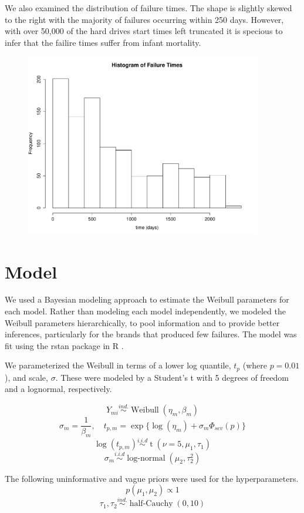 \documentclass{scrartcl}
\begin{document}
\noindent We also examined the distribution of failure times.  The shape is slightly skewed to the right with the majority of failures occurring within 250 days. However, with over 50,000 of the hard drives start times left truncated it is specious to infer that the failire times suffer from infant mortality.   
\begin{figure}[H]
\centering
\includegraphics[height=8cm]{failhist.pdf}
\end{figure}

\section*{Model}
We used a Bayesian modeling approach to estimate the Weibull parameters for each model. Rather than modeling each model independently, we modeled the Weibull parameters hierarchically, to pool information and to provide better inferences, particularly for the brands that produced few failures. The model was fit using the rstan package in R \cite{stan}.

We parameterized the Weibull in terms of a lower log quantile, $t_p$ (where $p=0.01$), and scale, $\sigma$. These were modeled by a Student's t with 5 degrees of freedom and a lognormal, respectively.

\[Y_{mi} \stackrel{ind.}{\sim} \operatorname{Weibull}(\eta_m, \beta_m)\]
\[\sigma_m = \frac{1}{\beta_m}, \quad t_{p,m} = \exp\{\log(\eta_m) + \sigma_m \Phi_{sev}(p)\}\]
\[\log(t_{p,m}) \stackrel{i.i.d}{\sim} \operatorname{t}(\nu = 5, \mu_1, \tau_1)\]
\[\sigma_m \stackrel{i.i.d}{\sim} \operatorname{log-normal}(\mu_2, \tau^2_2)\]

The following uninformative and vague priors were used for the hyperparameters.
\[p(\mu_1,\mu_2) \propto 1\]
\[\tau_1,\tau_2 \stackrel{ind.}{\sim} \operatorname{half-Cauchy}(0,10)\]
\end{document}
